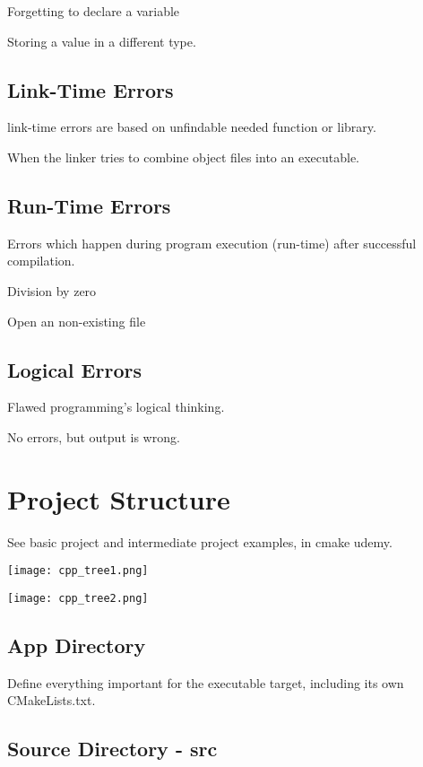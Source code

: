Forgetting to declare a variable

Storing a value in a different type. 

\subsection{Link-Time Errors}

link-time errors are based on unfindable needed function or library.

When the linker tries to combine object files into an executable.

\subsection{Run-Time Errors}

Errors which happen during program execution (run-time) after successful compilation.

Division by zero

Open an non-existing file

\subsection{Logical Errors}

Flawed programming's logical thinking. 

No errors, but output is wrong. 



\section{Project Structure}

See basic project and intermediate project examples, in cmake udemy.

\begin{center}
    \texttt{[image: cpp\_tree1.png]}
\end{center}


\begin{center}
    \texttt{[image: cpp\_tree2.png]}
\end{center}

\subsection{App Directory}

Define everything important for the executable target, including its own CMakeLists.txt.

\subsection{Source Directory - src}

